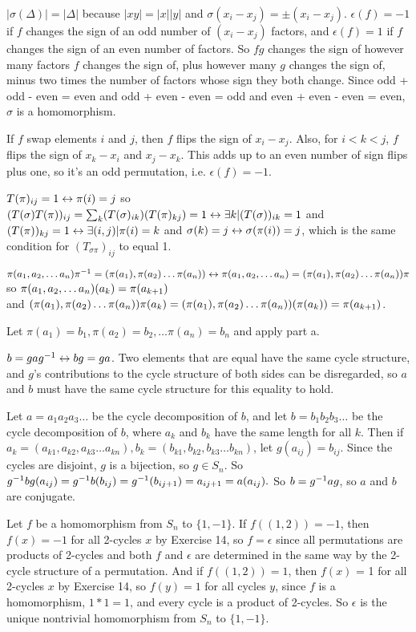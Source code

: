 \documentclass[11pt, oneside]{article}   	%
\begin{document}
\item $|\sigma(\Delta)| = |\Delta|$ because $|xy| = |x||y|$ and $\sigma(x_i - x_j) = \pm (x_i - x_j)$. $\epsilon(f) = -1$ if $f$ changes the sign of an odd number of $(x_i - x_j)$ factors, and $\epsilon(f) = 1$ if $f$ changes the sign of an even number of factors. So $fg$ changes the sign of however many factors $f$ changes the sign of, plus however many $g$ changes the sign of, minus two times the number of factors whose sign they both change. Since odd + odd - even = even and odd + even - even = odd and even + even - even = even, $\sigma$ is a homomorphism.
\item If $f$ swap elements $i$ and $j$, then $f$ flips the sign of $x_i - x_j$. Also, for $i < k < j$, $f$ flips the sign of $x_k - x_i$ and $x_j - x_k$. This adds up to an even number of sign flips plus one, so it's an odd permutation, i.e. $\epsilon(f) = -1$.
\item $T(\pi)_{ij} = 1 \leftrightarrow \pi(i) = j$ so $(T(\sigma)T(\pi))_{ij} = \sum_k(T(\sigma)_{ik})(T(\pi)_{kj}) = 1 \leftrightarrow \exists k | (T(\sigma))_{ik} = 1$ and $(T(\pi))_{kj} = 1 \leftrightarrow \exists (i, j) | \pi(i) = k$ and $\sigma(k) = j
\leftrightarrow \sigma(\pi(i)) = j$, which is the same condition for $(T_{\sigma\pi})_{ij}$ to equal 1.
\item \be
\item $\pi(a_1, a_2, \ldots a_n)\pi^{-1} =(\pi(a_1), \pi(a_2) \ldots \pi(a_n)) \leftrightarrow \pi(a_1, a_2, \ldots a_n) = (\pi(a_1), \pi(a_2) \ldots \pi(a_n))\pi$ so $\pi(a_1, a_2, \ldots a_n)(a_k) = \pi(a_{k+1})$ \\ and $(\pi(a_1), \pi(a_2) \ldots \pi(a_n))\pi(a_k) = (\pi(a_1), \pi(a_2) \ldots \pi(a_n))(\pi(a_k)) = \pi(a_{k+1})$. 
\item Let $\pi(a_1) = b_1, \pi(a_2) = b_2, \ldots \pi(a_n) = b_n$ and apply part a.
\item $b = gag^{-1} \leftrightarrow bg = ga$. Two elements that are equal have the same cycle structure, and $g$'s contributions to the cycle structure of both sides can be disregarded, so $a$ and $b$ must have the same cycle structure for this equality to hold.
\item Let $a = a_1a_2a_3\ldots$ be the cycle decomposition of $b$, and let $b = b_1b_2b_3\ldots$ be the cycle decomposition of $b$, where $a_k$ and $b_k$ have the same length for all $k$. Then if $a_k = (a_{k1}, a_{k2}, a_{k3}\ldots a_{kn}), b_k = (b_{k1}, b_{k2}, b_{k3}\ldots b_{kn})$, let $g(a_{ij}) = b_{ij}$. Since the cycles are disjoint, $g$ is a bijection, so $g \in S_n$. So $g^{-1} b g(a_{ij}) = g^{-1} b(b_{ij}) = g^{-1}(b_{ij+1}) = a_{ij+1} = a(a_{ij}).$ So $b = g^{-1} a g$, so $a$ and $b$ are conjugate.
\ee
\item Let $f$ be a homomorphism from $S_n$ to $\{1, -1\}$. If $f((1, 2)) = -1$, then $f(x) = -1$ for all 2-cycles $x$ by Exercise 14, so $f = \epsilon$ since all permutations are products of 2-cycles and both $f$ and $\epsilon$ are determined in the same way by the 2-cycle structure of a permutation. And if $f((1, 2)) = 1$, then $f(x)$ = 1 for all 2-cycles $x$ by Exercise 14, so $f(y) = 1$ for all cycles $y$, since $f$ is a homomorphism, $1*1 = 1$, and every cycle is a product of 2-cycles. So $\epsilon$ is the unique nontrivial homomorphism from $S_n$ to $\{1, -1\}$.
\end{document}
